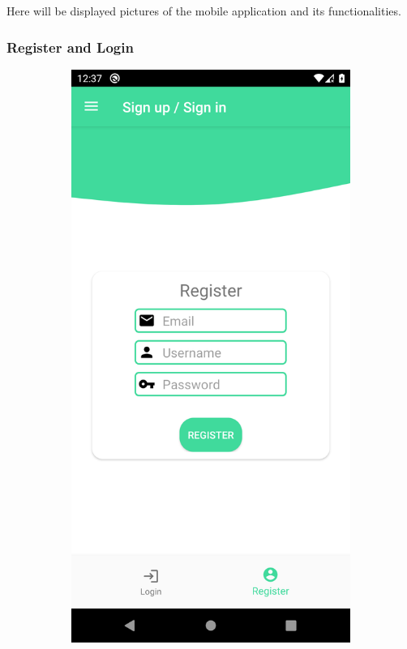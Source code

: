 Here will be displayed pictures of the mobile application and its functionalities.\\

\subsubsection{Register and Login}

\begin{figure}[H]
    \captionsetup[subfigure]{justification=centering}
    \begin{center}
        \begin{subfigure}{.3\textwidth}
            \includegraphics[scale=0.1, width=\textwidth]{_figures/register.png}

\end{subfigure}
\end{center}
\end{figure}
